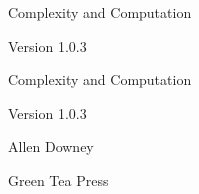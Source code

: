\documentclass[10pt]{book}
\newcommand{\thetitle}{Complexity and Computation}
\newcommand{\theversion}{1.0.3}
\begin{document}
\frontmatter




\newtheorem{ex}{Exercise}[chapter]

\begin{latexonly}

\renewcommand{\blankpage}{\thispagestyle{empty} \quad \newpage}



\thispagestyle{empty}

\begin{flushright}
\vspace*{2.0in}

\begin{spacing}{3}
{\huge \thetitle}
\end{spacing}

\vspace{0.25in}

Version \theversion

\vfill

\end{flushright}


\blankpage
\blankpage

\pagebreak
\thispagestyle{empty}

\begin{flushright}
\vspace*{2.0in}

\begin{spacing}{3}
{\huge \thetitle}
\end{spacing}

\vspace{0.25in}

Version \theversion

\vspace{1in}


{\Large
Allen Downey\\
}


\vspace{0.5in}

{\Large Green Tea Press}


\end{flushright}
\end{latexonly}
\end{document}
